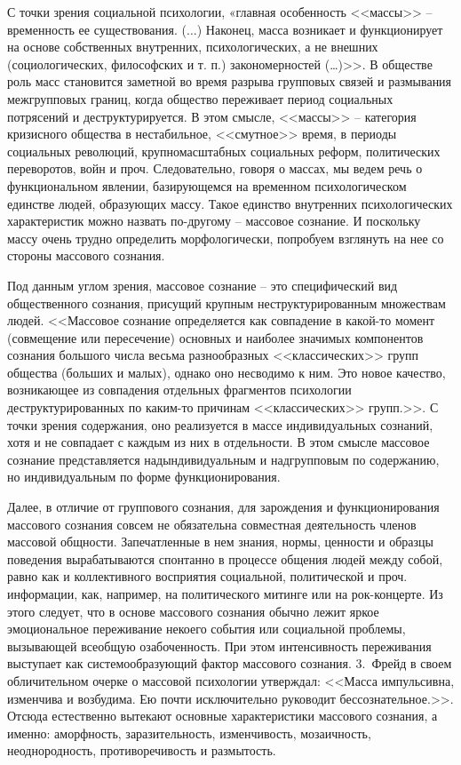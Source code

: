 С точки зрения социальной психологии,  «главная особенность <<массы>> -- временность ее существования. ($\ldots$)
Наконец, масса возникает и функционирует на основе собственных внутренних, психологических,
а не внешних (социологических, философских и т. п.) закономерностей (\ldots)>>\autocite{olshansky}.
В обществе роль масс становится заметной во время разрыва групповых связей и размывания
межгрупповых границ, когда общество переживает период социальных потрясений и деструктурируется.
В этом смысле, <<массы>> -- категория кризисного общества в нестабильное, <<смутное>> время, в периоды
социальных революций, крупномасштабных социальных реформ,
политических переворотов, войн и проч. Следовательно, говоря о массах, мы ведем речь о функциональном явлении,
базирующемся на временном психологическом единстве людей, образующих массу. Такое единство внутренних психологических
характеристик можно назвать по-другому -- массовое сознание. И поскольку массу очень трудно определить морфологически,
попробуем взглянуть на нее со стороны массового сознания.

Под данным углом зрения, массовое сознание -- это специфический вид общественного сознания, присущий крупным
неструктурированным множествам людей. <<Массовое сознание определяется как совпадение в какой-то момент
(совмещение или пересечение) основных и наиболее значимых компонентов сознания большого числа весьма
разнообразных <<классических>> групп общества (больших и малых), однако оно несводимо к ним. Это новое качество,
возникающее из совпадения отдельных фрагментов психологии деструктурированных по каким-то причинам <<классических>>
групп.>>\autocite{olshansky}.  С точки зрения содержания, оно реализуется в массе индивидуальных сознаний,
хотя и не совпадает с каждым из них в отдельности. В этом смысле массовое сознание представляется надындивидуальным
и надгрупповым по содержанию, но индивидуальным по форме функционирования.

Далее, в отличие от группового сознания, для зарождения и функционирования массового сознания совсем не
обязательна совместная деятельность членов массовой общности. Запечатленные в нем знания, нормы, ценности и
образцы поведения вырабатываются спонтанно в процессе общения людей между собой, равно как и коллективного
восприятия социальной, политической и проч. информации, как, например, на политического митинге или на рок-концерте.
Из этого следует, что в основе массового сознания обычно лежит яркое эмоциональное переживание некоего
события или социальной проблемы, вызывающей всеобщую озабоченность. При этом интенсивность переживания
выступает как системообразующий фактор массового сознания. 3.~Фрейд в своем обличительном очерке о массовой
психологии утверждал: <<Масса импульсивна, изменчива и возбудима. Ею почти исключительно руководит
бессознательное.>>\autocite[][78]{freid_mass}.  Отсюда естественно вытекают основные характеристики массового сознания,
а именно: аморфность, заразительность, изменчивость, мозаичность, неоднородность, противоречивость и
размытость\autocites{ashin}{flier}{prokudin}{heveshi}{hevishi2001tolpa}{streltsov1970}{dodonov1999}.

